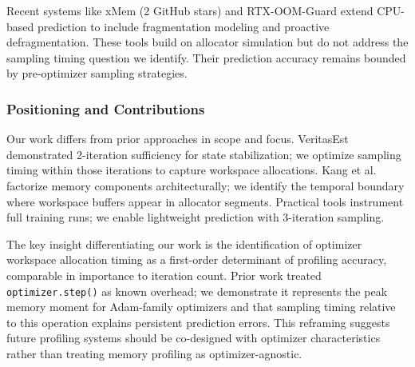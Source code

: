 Recent systems like xMem (2 GitHub stars) and RTX-OOM-Guard extend CPU-based prediction to include fragmentation modeling and proactive defragmentation. These tools build on allocator simulation but do not address the sampling timing question we identify. Their prediction accuracy remains bounded by pre-optimizer sampling strategies.

\subsubsection{Positioning and Contributions}

Our work differs from prior approaches in scope and focus. VeritasEst demonstrated 2-iteration sufficiency for state stabilization; we optimize sampling timing within those iterations to capture workspace allocations. Kang et al. factorize memory components architecturally; we identify the temporal boundary where workspace buffers appear in allocator segments. Practical tools instrument full training runs; we enable lightweight prediction with 3-iteration sampling.

The key insight differentiating our work is the identification of optimizer workspace allocation timing as a first-order determinant of profiling accuracy, comparable in importance to iteration count. Prior work treated \texttt{optimizer.step()} as known overhead; we demonstrate it represents the peak memory moment for Adam-family optimizers and that sampling timing relative to this operation explains persistent prediction errors. This reframing suggests future profiling systems should be co-designed with optimizer characteristics rather than treating memory profiling as optimizer-agnostic.

